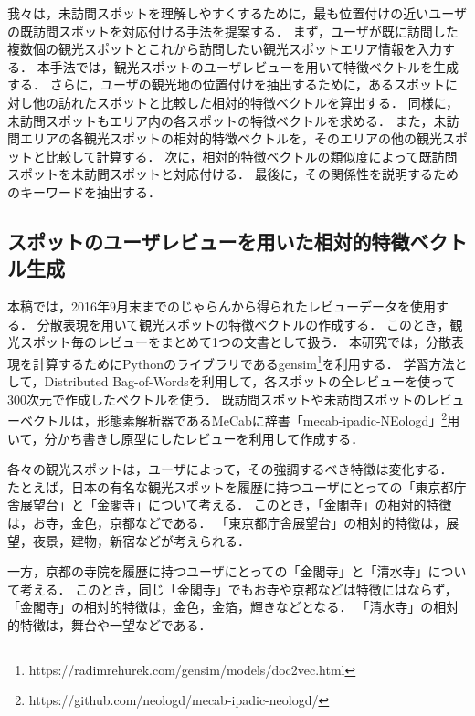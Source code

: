 \documentclass[submit]{ipsj}
\begin{document}
我々は，未訪問スポットを理解しやすくするために，最も位置付けの近いユーザの既訪問スポットを対応付ける手法を提案する．
まず，ユーザが既に訪問した複数個の観光スポットとこれから訪問したい観光スポットエリア情報を入力する．
本手法では，観光スポットのユーザレビューを用いて特徴ベクトルを生成する．
さらに，ユーザの観光地の位置付けを抽出するために，あるスポットに対し他の訪れたスポットと比較した相対的特徴ベクトルを算出する．
同様に，未訪問スポットもエリア内の各スポットの特徴ベクトルを求める．
また，未訪問エリアの各観光スポットの相対的特徴ベクトルを，そのエリアの他の観光スポットと比較して計算する．
次に，相対的特徴ベクトルの類似度によって既訪問スポットを未訪問スポットと対応付ける．
最後に，その関係性を説明するためのキーワードを抽出する．

\subsection{スポットのユーザレビューを用いた相対的特徴ベクトル生成}
\label{subsec:スポットのレビューから相対的特徴ベクトル生成}
本稿では，2016年9月末までのじゃらんから得られたレビューデータを使用する．
分散表現\cite{Le}を用いて観光スポットの特徴ベクトルの作成する．
このとき，観光スポット毎のレビューをまとめて1つの文書として扱う．
本研究では，分散表現を計算するためにPythonのライブラリであるgensim\footnote{https://radimrehurek.com/gensim/models/doc2vec.html}を利用する．
学習方法として，Distributed Bag-of-Wordsを利用して，各スポットの全レビューを使って300次元で作成したベクトルを使う．
既訪問スポットや未訪問スポットのレビューベクトルは，形態素解析器であるMeCab\cite{Kudo}に辞書「mecab-ipadic-NEologd」\footnote{https://github.com/neologd/mecab-ipadic-neologd/}用いて，分かち書きし原型にしたレビューを利用して作成する．

各々の観光スポットは，ユーザによって，その強調するべき特徴は変化する．
たとえば，日本の有名な観光スポットを履歴に持つユーザにとっての「東京都庁舎展望台」と「金閣寺」について考える．
このとき，「金閣寺」の相対的特徴は，お寺，金色，京都などである．
「東京都庁舎展望台」の相対的特徴は，展望，夜景，建物，新宿などが考えられる．

一方，京都の寺院を履歴に持つユーザにとっての「金閣寺」と「清水寺」について考える．
このとき，同じ「金閣寺」でもお寺や京都などは特徴にはならず，「金閣寺」の相対的特徴は，金色，金箔，輝きなどとなる．
「清水寺」の相対的特徴は，舞台や一望などである．
\end{document}
